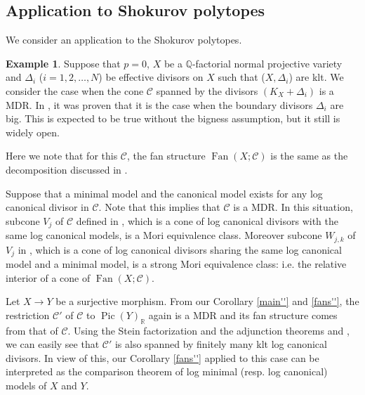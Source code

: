 \documentclass[12pt,twoside]{amsart}
\theoremstyle{definition}
\newtheorem{exmp}[theo]{Example}
\newcommand\Pic{\mathop{\mathrm{Pic}}\nolimits}
\newcommand\Fan{\mathop{\mathrm{Fan}}}
\newcommand\bq{\mathbb{Q}}
\newcommand\br{\mathbb{R}}
\begin{document}
\subsection{Application to Shokurov polytopes}\label{Application to the Shokurov polytopes}
We consider an application to the Shokurov polytopes.
\begin{exmp}\label{multi-adjoint rings}
Suppose that $p=0$, $X$ be a $\bq$-factorial normal projective variety and $\Delta_{i}$
($i=1,2,\dots,N$) be effective divisors on $X$ such that ($X,\Delta_{i}$) are klt.
We consider the case when the cone $\mathcal{C}$ spanned by the divisors $(K_X+\Delta_{i})$ is a MDR.
In \cite{bchm}, it was proven that it is the case when the boundary divisors $\Delta_i$ are big.
This is expected to be true without the bigness assumption, but it still is widely open.

Here we note that for this $\mathcal{C}$, the fan structure $\Fan{(X;\mathcal{C})}$ is the same as
the decomposition discussed in \cite{ka}.

Suppose that a minimal model and the canonical model
exists for any log canonical divisor in $\mathcal{C}$. Note that this implies that $\mathcal{C}$ is a MDR.
In this situation, subcone $V_j$ of $\mathcal{C}$ defined in \cite[Theorem 3]{ka}, which is a cone of
log canonical divisors with the same log canonical models,
is a Mori equivalence class. Moreover subcone $W_{j,k}$ of $V_j$ in \cite[Theorem 4]{ka}, which
is a cone of log canonical divisors sharing the same log canonical model and a minimal model,
is a strong Mori equivalence class: i.e. the relative
interior of a cone of  $\Fan{(X;\mathcal{C})}$.

Let $X\to Y$ be a surjective morphism.
From our Corollary \ref{main''} and \ref{fans''}, the restriction $\mathcal{C}'$ of $\mathcal{C}$ to $\Pic{(Y)}_{\br}$ again
is a MDR and its fan structure comes from that of $\mathcal{C}$. Using the Stein factorization and
the adjunction theorems \cite[Theorem 4.1]{a} and \cite[Lemma 1.1]{fg}, we can easily see that $\mathcal{C}'$
is also spanned by finitely many klt log canonical divisors. In view of this,
our Corollary \ref{fans''} applied to this case can be interpreted as the comparison theorem of
log minimal (resp. log canonical) models of $X$ and $Y$.
\end{exmp}
\end{document}
